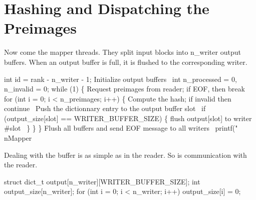 \documentclass{article}%
\begin{document}
\nwendcode{}\nwdocspar

\section{Hashing and Dispatching the Preimages}

Now come the mapper threads. They split input blocks into {\Tt{}n{\_}writer\nwendquote} output
buffers. When an output buffer is full, it is flushed to the corresponding
writer.

\nwenddocs{}\endmoddef\nwstartdeflinemarkup{}\nwenddeflinemarkup
int id = rank - n_writer - 1;
\LA{}Initialize output buffers~{\nwtagstyle{}}\RA{}
int n_processed = 0, n_invalid = 0;
while (1) \{
        \LA{}Request \code{}preimages\edoc{} from reader; if \code{}EOF\edoc{}, then \code{}break\edoc{}~{\nwtagstyle{}}\RA{}
        for (int i = 0; i < n_preimages; i++) \{
                \LA{}Compute the hash; if invalid then \code{}continue\edoc{}~{\nwtagstyle{}}\RA{}
                \LA{}Push the dictionnary entry to the output buffer \code{}slot\edoc{}~{\nwtagstyle{}}\RA{}
                if (output_size[slot] == WRITER_BUFFER_SIZE) \{
                        \LA{}flush \code{}output[slot]\edoc{} to writer \#\code{}slot\edoc{}~{\nwtagstyle{}}\RA{}
                \}
        \}
\}
\LA{}Flush all buffers and send \code{}EOF\edoc{} message to all writers~{\nwtagstyle{}}\RA{}
printf("\\nMapper %

\nwendcode{}Dealing with the buffer is as simple as in the reader. So is communication with the reader.

\nwenddocs{}\endmoddef\nwstartdeflinemarkup{}\nwenddeflinemarkup
struct dict_t output[n_writer][WRITER_BUFFER_SIZE];
int output_size[n_writer];
for (int i = 0; i < n_writer; i++)
        output_size[i] = 0;
\end{document}

